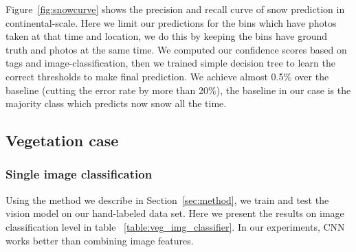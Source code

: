 %
%
%
Figure~\ref{fig:snowcurve} shows the precision and recall curve of snow prediction in continental-scale.
Here we limit our predictions for the bins which have photos taken at that time and location, we do this by keeping the bins have ground truth and photos at the same time. 
We computed our confidence scores based on tags and image-classification, then we trained simple decision tree to learn the correct thresholds to make final prediction. We achieve almost 0.5\% over the baseline (cutting the error rate by more than 20\%), the baseline in our case is the majority class which predicts now snow all the time.  
  





\subsection{Vegetation case}

\subsubsection{Single image classification}


Using the method we describe in Section~\ref{sec:method}, we train and test the vision model on our hand-labeled data set.
Here we present the results on image classification level in table ~\ref{table:veg_img_classifier}. In our experiments, CNN works better than combining image features.

%
%

